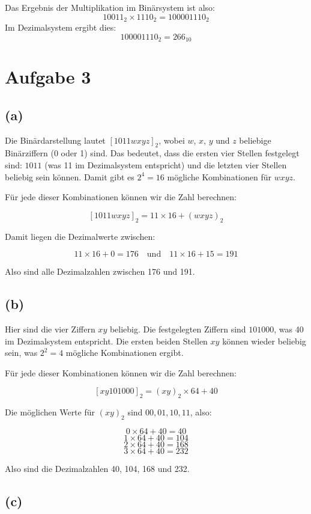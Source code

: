 \documentclass[a4paper]{scrartcl}
\begin{document}
Das Ergebnis der Multiplikation im Binärsystem ist also:
\[
10011_2 \times 1110_2 = 100001110_2
\]
Im Dezimalsystem ergibt dies:
\[
100001110_2 = 266_{10}
\]

\section*{Aufgabe 3}

\subsection*{(a)}

Die Binärdarstellung lautet $[1011wxyz]_2$, wobei $w$, $x$, $y$ und $z$ beliebige Binärziffern (0 oder 1) sind. Das bedeutet, dass die ersten vier Stellen festgelegt sind: $1011$ (was 11 im Dezimalsystem entspricht) und die letzten vier Stellen beliebig sein können. Damit gibt es $2^4 = 16$ mögliche Kombinationen für $wxyz$.

Für jede dieser Kombinationen können wir die Zahl berechnen:

\[
[1011wxyz]_2 = 11 \times 16 + (wxyz)_2
\]

Damit liegen die Dezimalwerte zwischen:

\[
11 \times 16 + 0 = 176 \quad \text{und} \quad 11 \times 16 + 15 = 191
\]

Also sind alle Dezimalzahlen zwischen 176 und 191.

\subsection*{(b)}

Hier sind die vier Ziffern $xy$ beliebig. Die festgelegten Ziffern sind $101000$, was 40 im Dezimalsystem entspricht. Die ersten beiden Stellen $xy$ können wieder beliebig sein, was $2^2 = 4$ mögliche Kombinationen ergibt.

Für jede dieser Kombinationen können wir die Zahl berechnen:

\[
[xy101000]_2 = (xy)_2 \times 64 + 40
\]

Die möglichen Werte für $(xy)_2$ sind $00, 01, 10, 11$, also:

\[
0 \times 64 + 40 = 40
\]
\[
1 \times 64 + 40 = 104
\]
\[
2 \times 64 + 40 = 168
\]
\[
3 \times 64 + 40 = 232
\]

Also sind die Dezimalzahlen 40, 104, 168 und 232.

\subsection*{(c)}
\end{document}
